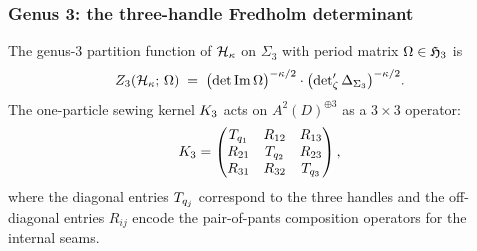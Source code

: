 \subsubsection{Genus 3: the three-handle Fredholm determinant}

\begin{theorem}%
%
The genus-$3$ partition function of $\mathcal{H}_\kappa$ on
$\Sigma_3$ with period matrix $\Omega \in \mathfrak{H}_3$ is
\begin{equation}%
Z_3(\cH_\kappa;\,\Omega)
\;=\;
\bigl(\det\operatorname{Im}\Omega\bigr)^{-\kappa/2}
\cdot
\bigl(\zetareg\Delta_{\Sigma_3}\bigr)^{-\kappa/2}.
\end{equation}
The one-particle sewing kernel $K_3$ acts on
$A^2(D)^{\oplus 3}$ as a $3 \times 3$ operator:
\begin{equation}%
\sewker_3
=
\begin{pmatrix}
\sewop_{q_1} & R_{12} & R_{13} \\
R_{21} & \sewop_{q_2} & R_{23} \\
R_{31} & R_{32} & \sewop_{q_3}
\end{pmatrix},
\end{equation}
where the diagonal entries $T_{q_j}$ correspond to the
three handles and the off-diagonal entries $R_{ij}$ encode the
pair-of-pants composition operators for the internal seams.
\end{theorem}

